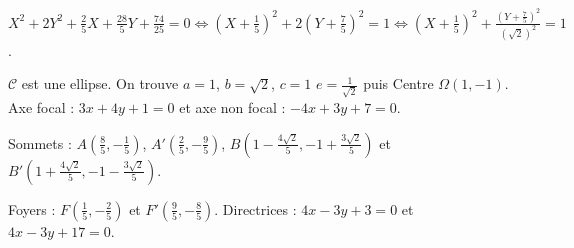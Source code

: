 {\begin{enumerate}
{{\begin{center}
$X^2+2Y^2+\frac{2}{5}X+\frac{28}{5}Y+\frac{74}{25}=0\Leftrightarrow\left(X+\frac{1}{5}\right)^2+2\left(Y+\frac{7}{5}\right)^2=1\Leftrightarrow\left(X+\frac{1}{5}\right)^2+\frac{\left(Y+\frac{7}{5}\right)^2}{\left(\sqrt{2}\right)^2}=1$.
\end{center}
$\mathcal{C}$ est une ellipse. On trouve $a=1$, $b=\sqrt{2}$, $c=1$ $e=\frac{1}{\sqrt{2}}$ puis
Centre $\Omega\left(1,-1\right)$. Axe focal : $3x+4y+1=0$ et axe non focal : $-4x+3y+7=0$.

Sommets : $A\left(\frac{8}{5},-\frac{1}{5}\right)$, $A'\left(\frac{2}{5},-\frac{9}{5}\right)$, $B\left(1-\frac{4\sqrt{2}}{5},-1+\frac{3\sqrt{2}}{5}\right)$ et $B'\left(1+\frac{4\sqrt{2}}{5},-1-\frac{3\sqrt{2}}{5}\right)$.

Foyers : $F\left(\frac{1}{5},-\frac{2}{5}\right)$ et $F'\left(\frac{9}{5},-\frac{8}{5}\right)$. Directrices : $4x-3y+3=0$ et $4x-3y+17=0$.}
    \item {}
}
\end{enumerate}}
